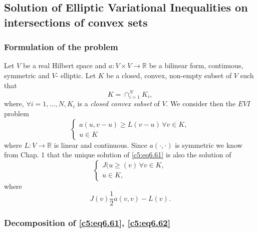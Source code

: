 \subsection{Solution of Elliptic Variational Inequalities on 
intersections of convex sets}\label{c5:ss6.5}%

\subsubsection{Formulation of the problem}\label{c5:sss6.5.1}%

Let $V$ be a real Hilbert space and $a : V \times V \to \mathbb{R}$ be 
a bilinear form,  continuous,  symmetric and $V$- elliptic. Let $K$ be 
a closed, convex,  non-empty subset of $V$ such that   
\begin{equation}
K = \cap^N_{i=1} K_i, \tag{6.60}\label{c5:eq6.60}
\end{equation}
where,  $\forall i = 1,  \ldots, N, K_i$ is a \textit{closed convex 
subset} of $V$.  We consider then the $EVI$ problem 
\begin{equation}
\begin{cases}
a (u, v - u) \geq L (v-u)\, \forall v \in K, \\
u \in K\tag{6.61}\label{c5:eq6.61}
\end{cases}
\end{equation}
where $L: V \to \mathbb{R}$ is linear and continuous. Since $a(\cdot , 
\cdot)$ is symmetric we know from Chap. 1 that the unique solution of 
\eqref{c5:eq6.61} is also the solution of   
\begin{equation}
\begin{cases}
J (u \geq (v)\, \forall v \in K, \\
u \in K, \tag{6.62}\label{c5:eq6.62}
\end{cases}
\end{equation}\pageoriginale  
where 
\begin{equation}
J (v) \frac{1}{2} a (v, v) - L(v). \tag{6.63}\label{c5:eq6.63}
\end{equation}

\subsubsection{Decomposition of \eqref{c5:eq6.61}, 
\eqref{c5:eq6.62}}\label{c5:sss6.5.2}%

